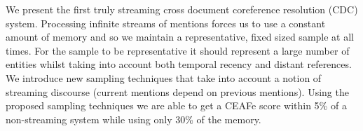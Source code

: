 We present the first truly streaming cross document coreference resolution (CDC) system. Processing infinite streams of mentions forces us to use a constant amount of memory and so we maintain a representative, fixed sized sample at all times. For the sample to be representative it should represent a large number of entities whilst taking into account both temporal recency and distant references. We introduce new sampling techniques that take into account a notion of streaming discourse (current mentions depend on previous mentions). Using the proposed sampling techniques we are able to get a CEAFe score within 5\% of a non-streaming system while using only 30\% of the memory.
